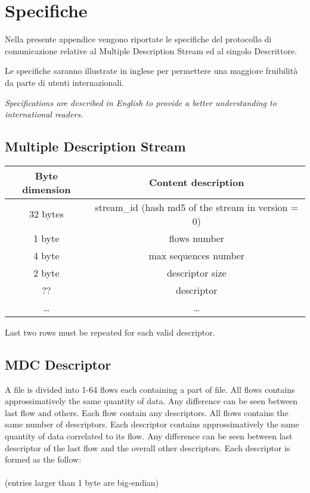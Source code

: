 \chapter{Specifiche}
Nella presente appendice vengono riportate le specifiche del protocollo di
comunicazione relative al Multiple Description Stream ed al singolo Descrittore.

Le specifiche saranno illustrate in inglese per permettere una maggiore
fruibilità da parte di utenti internazionali.

\emph{Specifications are described in English to provide a better
understanding to international readers.}

\section{Multiple Description Stream}
\begin{center} \begin{tabular}{|c|c|}
\hline
Byte dimension & Content description\\
\hline \hline
32 bytes & stream\_id (hash md5 of the stream in version = 0)\\
1 byte & flows number\\
4 byte & max sequences number\\
2 byte &descriptor size\\
?? & descriptor\\
\ldots & \ldots\\
\hline
\end{tabular} \end{center}
Last two rows must be repeated for each valid descriptor.

\section{MDC Descriptor}
A file is divided into 1-64 flows each containing a part of file. All flows contains
approssimatively the same quantity of data. Any difference can be seen between last flow and
others. Each flow contain any descriptors. All flows contains the same number of descriptors.
Each descriptor contains approssimatively the same quantity of data correlated to its flow.
Any difference can be seen between last descriptor of the last flow and the overall other
descriptors. Each descriptor is formed as the follow:\\
\\
(entries larger than 1 byte are big-endian)\\

